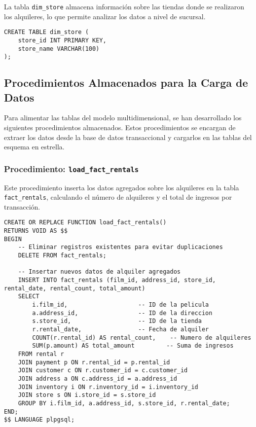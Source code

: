 \documentclass{article}
\begin{document}
La tabla \texttt{dim\_store} almacena información sobre las tiendas donde se realizaron los alquileres, lo que permite analizar los datos a nivel de sucursal.

\begin{lstlisting}
CREATE TABLE dim_store (
    store_id INT PRIMARY KEY,
    store_name VARCHAR(100)
);
\end{lstlisting}

\newpage
\subsection{Procedimientos Almacenados para la Carga de Datos}

Para alimentar las tablas del modelo multidimensional, se han desarrollado los siguientes procedimientos almacenados. Estos procedimientos se encargan de extraer los datos desde la base de datos transaccional y cargarlos en las tablas del esquema en estrella.

\subsubsection{Procedimiento: \texttt{load\_fact\_rentals}}

Este procedimiento inserta los datos agregados sobre los alquileres en la tabla \texttt{fact\_rentals}, calculando el número de alquileres y el total de ingresos por transacción.

\begin{lstlisting}
CREATE OR REPLACE FUNCTION load_fact_rentals()
RETURNS VOID AS $$
BEGIN
    -- Eliminar registros existentes para evitar duplicaciones
    DELETE FROM fact_rentals;

    -- Insertar nuevos datos de alquiler agregados
    INSERT INTO fact_rentals (film_id, address_id, store_id, rental_date, rental_count, total_amount)
    SELECT 
        i.film_id,                    -- ID de la pelicula
        a.address_id,                 -- ID de la direccion
        s.store_id,                   -- ID de la tienda
        r.rental_date,                -- Fecha de alquiler
        COUNT(r.rental_id) AS rental_count,    -- Numero de alquileres
        SUM(p.amount) AS total_amount         -- Suma de ingresos
    FROM rental r
    JOIN payment p ON r.rental_id = p.rental_id
    JOIN customer c ON r.customer_id = c.customer_id
    JOIN address a ON c.address_id = a.address_id
    JOIN inventory i ON r.inventory_id = i.inventory_id
    JOIN store s ON i.store_id = s.store_id
    GROUP BY i.film_id, a.address_id, s.store_id, r.rental_date;
END;
$$ LANGUAGE plpgsql;
\end{lstlisting}
\end{document}
